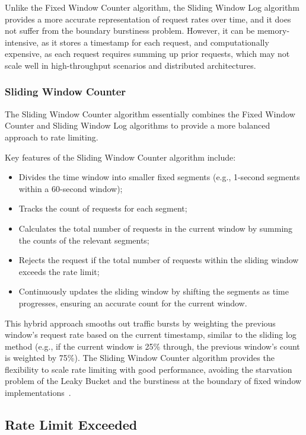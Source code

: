 Unlike the Fixed Window Counter algorithm,
the Sliding Window Log algorithm provides a more accurate representation of request rates over time,
and it does not suffer from the boundary burstiness problem.
However, it can be memory-intensive, as it stores a timestamp for each request, and computationally expensive,
as each request requires summing up prior requests,
which may not scale well in high-throughput scenarios and distributed architectures.

\subsubsection{Sliding Window Counter}\label{subsubsec:sliding-window-counter-algorithm}

The Sliding Window Counter algorithm essentially combines the Fixed Window Counter and
Sliding Window Log algorithms to provide a more balanced approach to rate limiting.

Key features of the Sliding Window Counter algorithm include:

\begin{itemize}
    \item Divides the time window into smaller fixed segments (e.g., 1-second segments within a 60-second window);
    \item Tracks the count of requests for each segment;
    \item Calculates the total number of requests in the current window by summing the counts of the relevant segments;
    \item Rejects the request if the total number of requests within the sliding window exceeds the rate limit;
    \item Continuously updates the sliding window by shifting the segments as time progresses, ensuring an accurate count for the current window.
\end{itemize}

This hybrid approach smooths out traffic bursts
by weighting the previous window’s request rate based on the current timestamp,
similar to the sliding log method
(e.g., if the current window is 25\% through, the previous window's count is weighted by 75\%).
The Sliding Window Counter algorithm provides the flexibility to scale rate limiting with good performance,
avoiding the starvation problem of the Leaky Bucket and the burstiness at the boundary of fixed window implementations~\cite{kong-rate-limiting}.

\subsection{Rate Limit Exceeded}\label{subsec:rate-limiter-exceeded}

